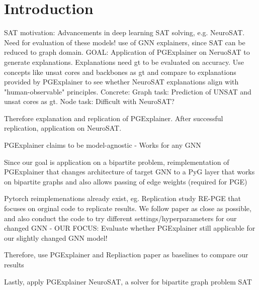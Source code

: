 \chapter{Introduction}
\label{ch:Introduction}

SAT motivation: Advancements in deep learning SAT solving, e.g. NeuroSAT. Need for evaluation of these models! use of GNN explainers, since SAT can be reduced to graph domain. GOAL: Application of PGExplainer on NeruoSAT to generate explanations. Explanations need gt to be evaluated on accuracy. Use concepts like unsat cores and backbones as gt and compare to explanations provided by PGExplainer to see whether NeuroSAT explanations align with "human-observable" principles.
Concrete: Graph task: Prediction of UNSAT and unsat cores as gt. Node task: Difficult with NeuroSAT?\bigskip

Therefore explanation and replication of PGExplainer. After successful replication, application on NeuroSAT. \bigskip

PGExplainer claims to be model-agnostic - Works for any GNN\bigskip

Since our goal is application on a bipartite problem, reimplementation of PGExplainer that changes architecture of target GNN to a PyG layer that works on bipartite graphs and also allows passing of edge weights (required for PGE)\bigskip

Pytorch reimplemenations already exist, eg. Replication study RE-PGE that focuses on orginal code to replicate results. We follow paper as close as possible, and also conduct the code to try different settings/hyperparameters for our changed GNN - OUR FOCUS: Evaluate whether PGExplainer still applicable for our slightly changed GNN model!\bigskip

Therefore, use PGExplainer and Repliaction paper as baselines to compare our results \bigskip

Lastly, apply PGExplainer NeuroSAT, a solver for bipartite graph problem SAT